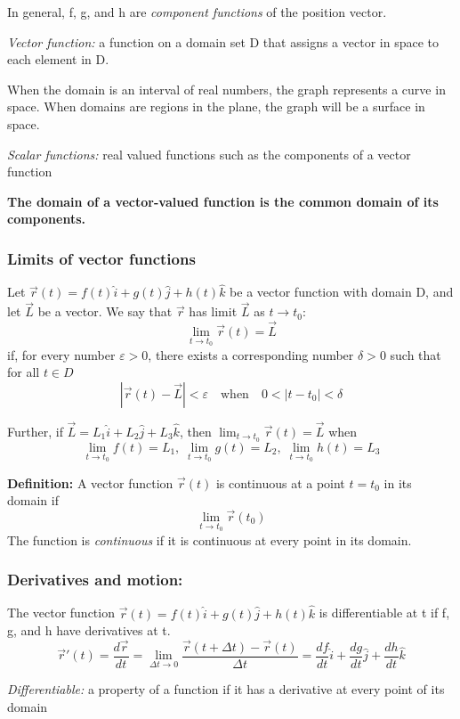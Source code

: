 \documentclass[12pt]{article}
\begin{document}
In general, f, g, and h are \emph{component functions} of the position vector.

\emph{Vector function:} a function on a domain set D that assigns a vector in space to each element in D. 

When the domain is an interval of real numbers, the graph represents a curve in space. When domains are regions in the plane, the graph will be a surface in space. 

\emph{Scalar functions:} real valued functions such as the components of a vector function

\textbf{The domain of a vector-valued function is the common domain of its components.}

\subsubsection{Limits of vector functions}
Let $\vec{r}(t) = f(t)\hat{i} + g(t) \hat{j} + h(t) \hat{k}$ be a vector function with domain D, and let $\vec{L}$ be a vector. We say that $\vec{r}$ has limit $\vec{L}$ as $t \rightarrow t_0$:
\[\lim_{t \to t_0} \vec{r}(t )= \vec{L}\]
if, for every number $\varepsilon > 0$, there exists a corresponding number $\delta > 0$ such that for all $t \in D$
\[|\vec{r}(t) - \vec{L}| < \varepsilon \quad \text{when} \quad 0 < |t - t_0| < \delta\]

Further, if $\vec{L} = L_1 \hat{i} + L_2 \hat{j} + L_3 \hat{k}$, then $\lim_{t\to t_0} \vec{r}(t) = \vec{L}$ when 
\[\lim_{t \to t_0} f(t) = L_1, \; \lim_{t \to t_0} g(t) = L_2, \; \lim_{t \to t_0} h(t) = L_3\]

\textbf{Definition:}
A vector function $\vec{r}(t)$ is continuous at a point $t = t_0$ in its domain if 
\[\lim _{t\to t_0} \vec{r}(t_0)\]
The function is \emph{continuous} if it is continuous at every point in its domain. 

\subsubsection{Derivatives and motion:}
The vector function $\vec{r}(t) = f(t)\hat{i} + g(t) \hat{j} + h(t) \hat{k}$ is differentiable at t if f, g, and h have derivatives at t.
\[\vec{r}'(t) = \frac{d\vec{r}}{dt} = \lim_{\Delta t \to 0} \frac{\vec{r}(t + \Delta t) - \vec{r}(t)}{\Delta t} = \frac{df}{dt} \hat{i} + \frac{dg}{dt} \hat{j} + \frac{dh}{dt} \hat{k}\]

\emph{Differentiable:} a property of a function if it has a derivative at every point of its domain
\end{document}
